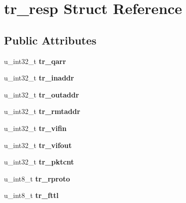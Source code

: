 \hypertarget{structtr__resp}{
\section{tr\_\-resp Struct Reference}
\label{structtr__resp}
}
\subsection*{Public Attributes}
\begin{DoxyCompactItemize}
\item 
\hypertarget{structtr__resp_a4db9048119b92d7d6e2e3236d36c84ac}{
u\_\-int32\_\-t {\bfseries tr\_\-qarr}}
\label{structtr__resp_a4db9048119b92d7d6e2e3236d36c84ac}

\item 
\hypertarget{structtr__resp_adb398e0c3bf322622e6b62ab65e40bbb}{
u\_\-int32\_\-t {\bfseries tr\_\-inaddr}}
\label{structtr__resp_adb398e0c3bf322622e6b62ab65e40bbb}

\item 
\hypertarget{structtr__resp_af37eddbe433d421fdf24d25fa91a56a7}{
u\_\-int32\_\-t {\bfseries tr\_\-outaddr}}
\label{structtr__resp_af37eddbe433d421fdf24d25fa91a56a7}

\item 
\hypertarget{structtr__resp_a7fc9ea7f2b90267b7b0dacbc073b9efe}{
u\_\-int32\_\-t {\bfseries tr\_\-rmtaddr}}
\label{structtr__resp_a7fc9ea7f2b90267b7b0dacbc073b9efe}

\item 
\hypertarget{structtr__resp_ae638fedde0bf6a5cbc2a23485e72815d}{
u\_\-int32\_\-t {\bfseries tr\_\-vifin}}
\label{structtr__resp_ae638fedde0bf6a5cbc2a23485e72815d}

\item 
\hypertarget{structtr__resp_a4e46732d55ca50b83577e6c5ed639a84}{
u\_\-int32\_\-t {\bfseries tr\_\-vifout}}
\label{structtr__resp_a4e46732d55ca50b83577e6c5ed639a84}

\item 
\hypertarget{structtr__resp_a83035170cc9d2fb4d4077bd8dddd1a60}{
u\_\-int32\_\-t {\bfseries tr\_\-pktcnt}}
\label{structtr__resp_a83035170cc9d2fb4d4077bd8dddd1a60}

\item 
\hypertarget{structtr__resp_ada8249e62469574283b509e7d43cc994}{
u\_\-int8\_\-t {\bfseries tr\_\-rproto}}
\label{structtr__resp_ada8249e62469574283b509e7d43cc994}

\item 
\hypertarget{structtr__resp_a54195646082743bf2a2b40cff00cabe2}{
u\_\-int8\_\-t {\bfseries tr\_\-fttl}}
\label{structtr__resp_a54195646082743bf2a2b40cff00cabe2}


\end{DoxyCompactItemize}
